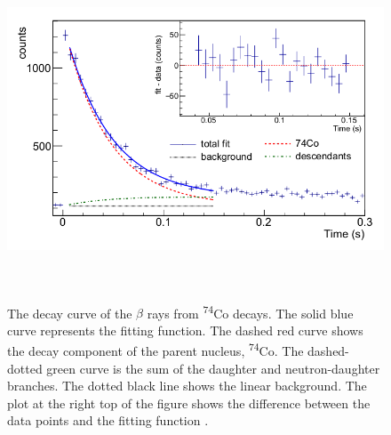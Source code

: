 \newpage
\begin{figure}[h!]
    \centering
    \includegraphics[width=15cm,height=10cm]{figures/half_life.png}
    \caption[The decay curve of the $\beta$ rays from \textsuperscript{74}Co decays]{The decay curve of the $\beta$ rays from \textsuperscript{74}Co decays. The solid blue curve represents the fitting function. The dashed red curve shows the decay component of the parent nucleus,
\textsuperscript{74}Co. The dashed-dotted green curve is the sum of the daughter and neutron-daughter branches. The dotted black line shows the linear background. The plot at the right top of the
figure shows the difference between the data points and the
fitting function \citep{yso2018}.}
    \label{fig:yso_halflife}
\end{figure}

\pagebreak

